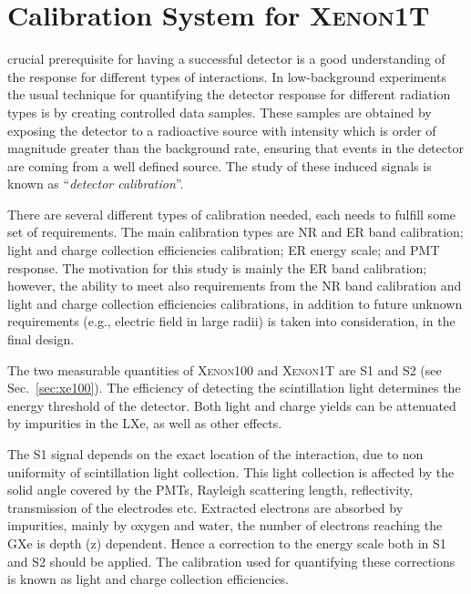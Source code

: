 %
%
\let\textcircled=\pgftextcircled

\chapter{Calibration System for \textsc{Xenon1T}} \label{chap:calib}
\label{chap:calibration}
 crucial prerequisite for having a successful detector is a good understanding of the response for different types of interactions. In low-background experiments the usual technique for quantifying the detector response for different radiation types is by creating controlled data samples. These samples are obtained by exposing the detector to a radioactive source with intensity which is order of magnitude greater than the background rate, ensuring that events in the detector are coming from a well defined source. The study of these induced signals is known as ``\textit{detector calibration}''. 

There are several different types of calibration needed, each needs to fulfill some set of requirements. The main calibration types are NR and ER band calibration; light and charge collection efficiencies calibration; ER energy scale; and PMT response. The motivation for this study is mainly the ER band calibration; however, the ability to meet also requirements from the NR band calibration and light and charge collection efficiencies calibrations, in addition to future unknown requirements (e.g., electric field in large radii) is taken into consideration, in the final design.      

The two measurable quantities of \textsc{Xenon100} and \textsc{Xenon1T} are S1 and S2 (see Sec.~\ref{sec:xe100}). The efficiency of detecting the scintillation light determines the energy threshold of the detector. Both light and charge yields can be attenuated by impurities in the LXe, as well as other effects. 

The S1 signal depends on the exact location of the interaction, due to non uniformity of scintillation light collection. This light collection is affected by the solid angle covered by the PMTs, Rayleigh scattering length, reflectivity, transmission of the electrodes etc. Extracted electrons are absorbed by impurities, mainly by oxygen and water, the number of electrons reaching the GXe is depth (z) dependent. Hence a correction to the energy scale both in S1 and S2 should be applied. The calibration used for quantifying these corrections is known as light and charge collection efficiencies. 

